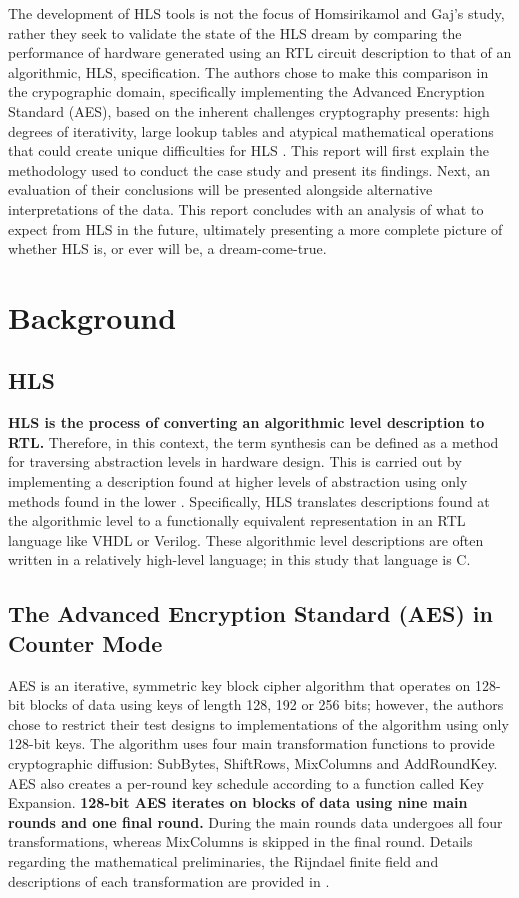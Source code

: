 \documentclass[12pt,journal,compsoc,onecolumn]{IEEEtran}
\begin{document}
The development of HLS tools is not the focus of Homsirikamol and Gaj's study, rather they seek to validate the state of the HLS dream by comparing the performance of hardware generated using an RTL circuit description to that of an algorithmic, HLS, specification. The authors chose to make this comparison in the crypographic domain, specifically implementing the Advanced Encryption Standard (AES), based on the inherent challenges cryptography presents: high degrees of iterativity, large lookup tables and atypical mathematical operations that could create unique difficulties for HLS \cite{sel}. This report will first explain the methodology used to conduct the case study and present its findings. Next, an evaluation of their conclusions will be presented alongside alternative interpretations of the data. This report concludes with an analysis of what to expect from HLS in the future, ultimately presenting a more complete picture of whether HLS is, or ever will be, a dream-come-true.

\section{Background}
\subsection{HLS}\label{sec:hls}

\textbf{HLS is the process of converting an algorithmic level description to RTL.} Therefore, in this context, the term synthesis can be defined as a method for traversing abstraction levels in hardware design. This is carried out by implementing a description found at higher levels of abstraction using only methods found in the lower \cite{churtl}. Specifically, HLS translates descriptions found at the algorithmic level to a functionally equivalent representation in an RTL language like VHDL or Verilog. These algorithmic level descriptions are often written in a relatively high-level language; in this study that language is C. 

\subsection{The Advanced Encryption Standard (AES) in Counter Mode}

AES is an iterative, symmetric key block cipher algorithm that operates on 128-bit blocks of data using keys of length 128, 192 or 256 bits; however, the authors chose to restrict their test designs to implementations of the algorithm using only 128-bit keys. The algorithm uses four main transformation functions to provide cryptographic diffusion: SubBytes, ShiftRows, MixColumns and AddRoundKey. AES also creates a per-round key schedule according to a function called Key Expansion. \textbf{128-bit AES iterates on blocks of data using nine main rounds and one final round.} During the main rounds data undergoes all four transformations, whereas MixColumns is skipped in the final round. Details regarding the mathematical preliminaries, the Rijndael finite field and descriptions of each transformation are provided in \cite{13}. 
\end{document}
